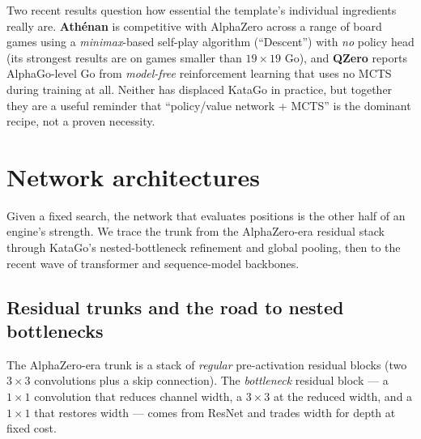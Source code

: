 \documentclass[11pt]{article}
\begin{document}
Two recent results question how essential the template's individual ingredients really are.
\textbf{Athénan} \cite{athenan2023} is competitive with AlphaZero across a range of board
games using a \emph{minimax}-based self-play algorithm (``Descent'') with \emph{no} policy
head (its strongest results are on games smaller than $19\times19$ Go), and \textbf{QZero}
\cite{qzero2026} reports AlphaGo-level Go from \emph{model-free} reinforcement learning that
uses no MCTS during training at all. Neither has displaced KataGo in practice,
but together they are a useful reminder that ``policy/value network + MCTS'' is the dominant
recipe, not a proven necessity.

\section{Network architectures}
\label{sec:arch}
Given a fixed search, the network that evaluates positions is the other half of an engine's
strength. We trace the trunk from the AlphaZero-era residual stack through KataGo's
nested-bottleneck refinement and global pooling, then to the recent wave of transformer and
sequence-model backbones.

\subsection{Residual trunks and the road to nested bottlenecks}
\label{sec:nbt}
The AlphaZero-era trunk is a stack of \emph{regular} pre-activation residual blocks (two
$3\times3$ convolutions plus a skip connection). The \emph{bottleneck} residual block ---
a $1\times1$ convolution that reduces channel width, a $3\times3$ at the reduced width,
and a $1\times1$ that restores width --- comes from ResNet \cite{resnet2016} and trades
width for depth at fixed cost.
\end{document}
